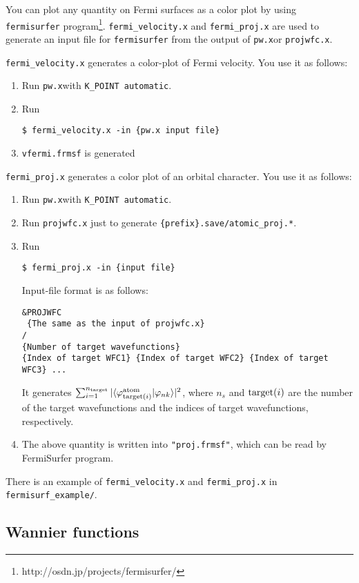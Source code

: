 \documentclass[12pt,a4paper]{article}
\def\pwx{\texttt{pw.x}}
\begin{document}
You can plot any quantity on Fermi surfaces as a color plot 
by using \verb|fermisurfer| program\footnote{http://osdn.jp/projects/fermisurfer/}.
\verb|fermi_velocity.x| and \verb|fermi_proj.x| are used 
to generate an input file for \verb|fermisurfer| from the output
of \pwx or \verb|projwfc.x|.

\verb|fermi_velocity.x| generates a color-plot of Fermi velocity.
You use it as follows:
\begin{enumerate}
\item Run \pwx with \verb|K_POINT automatic|.
\item Run 
\begin{verbatim}
$ fermi_velocity.x -in {pw.x input file}
\end{verbatim}  
\item \verb|vfermi.frmsf| is generated
\end{enumerate}

\verb|fermi_proj.x| generates a color plot of an orbital character.
You use it as follows:
\begin{enumerate}
\item Run \pwx with \verb|K_POINT automatic|.
\item Run \verb|projwfc.x| just to generate \verb|{prefix}.save/atomic_proj.*|.
\item Run 
\begin{verbatim}
$ fermi_proj.x -in {input file}
\end{verbatim}
Input-file format is as follows:
\begin{verbatim}
&PROJWFC
 {The same as the input of projwfc.x}
/
{Number of target wavefunctions}
{Index of target WFC1} {Index of target WFC2} {Index of target WFC3} ...
\end{verbatim}
It generates 
$\sum_{i=1}^{n_{\rm target}} |\langle \varphi_{{\rm target}(i)}^{\rm atom}|\varphi_{n k} \rangle|^2$, 
where $n_s$ and ${\rm target}(i)$ are
the number of the target wavefunctions
and the indices of target wavefunctions, respectively.
\item The above quantity is written into \verb|"proj.frmsf"|,
  which can be read by FermiSurfer program.
\end{enumerate}

There is an example of \verb|fermi_velocity.x| and \verb|fermi_proj.x|
in \verb|fermisurf_example/|.

\subsection{Wannier functions}
\end{document}
